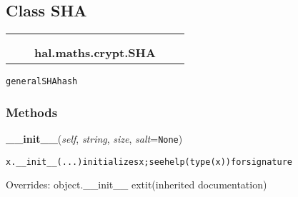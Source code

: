 \subsection{Class SHA}

    \label{hal:maths:crypt:SHA}
\begin{tabular}{cccccc}
\multicolumn{2}{r}{\settowidth{\BCL}{object}\multirow{2}{\BCL}{object}}
&&
  \\\cline{3-3}
  &&\multicolumn{1}{c|}{}
&&
  \\
&&\multicolumn{2}{l}{\textbf{hal.maths.crypt.SHA}}
\end{tabular}

\begin{alltt}
general SHA hash 
\end{alltt}



  \subsubsection{Methods}

    \vspace{0.5ex}

\hspace{.8\funcindent}\begin{boxedminipage}{\funcwidth}

    \raggedright \textbf{\_\_init\_\_}(\textit{self}, \textit{string}, \textit{size}, \textit{salt}={\tt None})

\setlength{\parskip}{2ex}
\begin{alltt}
x.\_\_init\_\_(...) initializes x; see help(type(x)) for signature
\end{alltt}

\setlength{\parskip}{1ex}
      Overrides: object.\_\_init\_\_ 	extit{(inherited documentation)}

    \end{boxedminipage}

    \label{hal:maths:crypt:SHA:hash}

